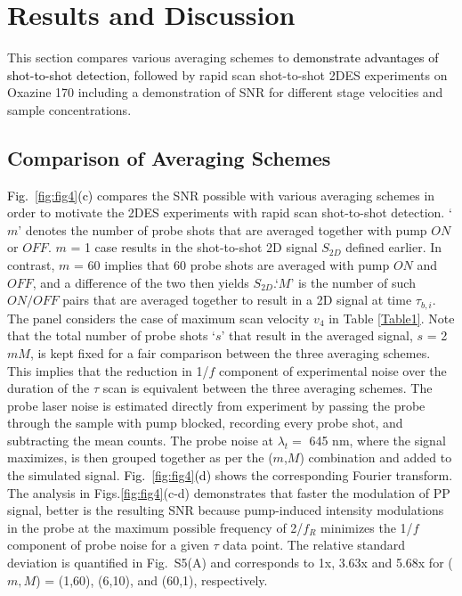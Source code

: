 \documentclass[%
aip,
amsmath,amssymb,
preprint,%
]{revtex4-2}
\newcommand*{\vt}[1]{\textcolor{black}{ #1}}
\newcommand*{\si}[1]{\textcolor{black}{ #1}}
\begin{document}

\section{Results and Discussion}\label{results}

This section compares various averaging schemes to \vt{demonstrate advantages of shot-to-shot detection}, followed by rapid scan shot-to-shot 2DES experiments on Oxazine 170 including a demonstration of SNR for different stage velocities and sample concentrations.

\subsection{Comparison of Averaging Schemes}
\si{Fig.~\ref{fig:fig4}(c)} compares the SNR possible with various averaging schemes in order to motivate the 2DES experiments with rapid scan shot-to-shot detection. `$m$' denotes the number of probe shots that are averaged together with pump $ON$ or $OFF$. $m$ = 1 case results in the shot-to-shot 2D signal $S_{2D}$ defined earlier. In contrast, $m$ = 60 implies that 60 probe shots are averaged with pump $ON$ and $OFF$, and a difference of the two then yields $S_{2D}$.`$M$' is the number of such $ON/OFF$ pairs that are averaged together to result in a 2D signal at time $\tau_{b,i}$. The panel considers the case of maximum scan velocity $v_4$ in Table \ref{Table1}. Note that the total number of probe shots `$s$' that result in the averaged signal, $s$ = 2$m$$M$, is kept fixed for a fair comparison between the three averaging schemes. This implies that the reduction in 1/$f$ component of experimental noise over the duration of the $\tau$ scan \cite{Moon1993,Kearns2017} is equivalent between the three averaging schemes. The probe laser noise is estimated directly from experiment by passing the probe through the sample with pump blocked, recording every probe shot, and subtracting the mean counts. The probe noise at $\lambda_t = $ 645 nm, where the signal maximizes, is then grouped together as per the ($m$,$M$) combination and added to the simulated signal. \si{Fig.~\ref{fig:fig4}(d)} shows the corresponding Fourier transform. The analysis in Figs.\ref{fig:fig4}(c-d) demonstrates that faster the modulation of PP signal, better is the resulting SNR because pump-induced intensity modulations in the probe at the maximum possible frequency of 2/$f_R$ minimizes the 1/$f$ component\cite{Moon1993} of probe noise for a given $\tau$ data point. The relative standard deviation is quantified in Fig.~S5(A) and corresponds to  1x, 3.63x and 5.68x for ($m,M$) = (1,60), (6,10), and (60,1), respectively. %
\end{document}
